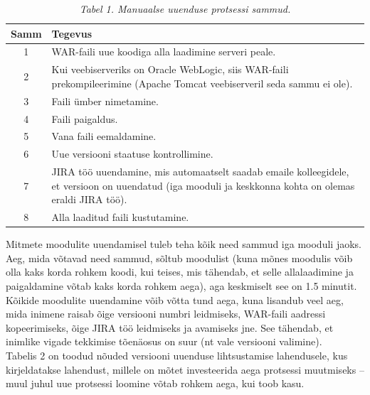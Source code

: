 \documentclass[12pt]{report}
\begin{document}
  \begin{table}[H]
    \caption*{\textit{Tabel 1. Manuaalse uuenduse protsessi sammud.}}
  
    \begin{tabular}{ |c|p{11cm}| }
      \hline
      \textbf{Samm} & \textbf{Tegevus}\\
      \hline
      1 & WAR\--faili uue koodiga alla laadimine serveri peale.\\
      \hline
      2 & Kui veebiserveriks on Oracle WebLogic, siis WAR\--faili prekompileerimine (Apache Tomcat veebiserveril seda sammu ei ole).\\
      \hline
      3 & Faili ümber nimetamine.\\
      \hline
      4 & Faili paigaldus.\\
      \hline
      5 & Vana faili eemaldamine.\\
      \hline
      6 & Uue versiooni staatuse kontrollimine.\\
      \hline
      7 & JIRA\footnotemark{} töö uuendamine, mis automaatselt saadab emaile kolleegidele, et versioon on uuendatud (iga mooduli ja keskkonna kohta on olemas eraldi JIRA töö).\\
      \hline
      8 & Alla laaditud faili kustutamine.\\
      \hline
    \end{tabular}
  \end{table}
  
  
  Mitmete moodulite uuendamisel tuleb teha kõik need sammud iga mooduli jaoks. Aeg, mida võtavad need sammud, sõltub moodulist (kuna mõnes moodulis võib olla kaks korda rohkem koodi, kui teises, mis tähendab, et selle allalaadimine ja paigaldamine võtab kaks korda rohkem aega), aga keskmiselt see on 1.5 minutit. Kõikide moodulite uuendamine võib võtta tund aega, kuna lisandub veel aeg, mida inimene raisab õige versiooni numbri leidmiseks, WAR\--faili aadressi kopeerimiseks, õige JIRA töö leidmiseks ja avamiseks jne. See tähendab, et inimlike vigade tekkimise tõenäosus on suur (nt vale versiooni valimine).\\
  
  Tabelis 2 on toodud nõuded versiooni uuenduse lihtsustamise lahendusele, kus kirjeldatakse lahendust, millele on mõtet investeerida aega protsessi muutmiseks \--- muul juhul uue protsessi loomine võtab rohkem aega, kui toob kasu.
  
\end{document}
